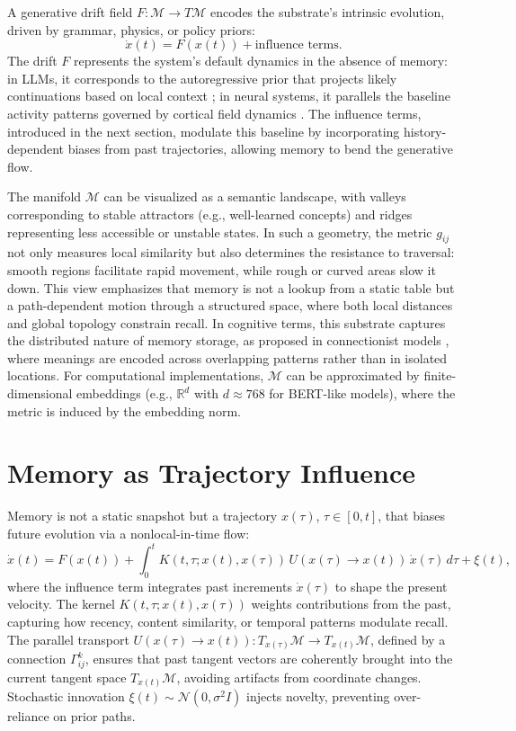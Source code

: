 \documentclass[a4paper,12pt]{article}
\newcommand{\M}{\mathcal{M}}
\begin{document}
A generative drift field $F: \M \to T\M$ encodes the substrate's intrinsic evolution, driven by grammar, physics, or policy priors:
\[
\dot{x}(t) = F(x(t)) + \text{influence terms}.
\]
The drift $F$ represents the system's default dynamics in the absence of memory: in LLMs, it corresponds to the autoregressive prior that projects likely continuations based on local context \citep{vaswani2017attention}; in neural systems, it parallels the baseline activity patterns governed by cortical field dynamics \citep{amari1977dynamics}. The influence terms, introduced in the next section, modulate this baseline by incorporating history-dependent biases from past trajectories, allowing memory to bend the generative flow.

The manifold $\M$ can be visualized as a semantic landscape, with valleys corresponding to stable attractors (e.g., well-learned concepts) and ridges representing less accessible or unstable states. In such a geometry, the metric $g_{ij}$ not only measures local similarity but also determines the resistance to traversal: smooth regions facilitate rapid movement, while rough or curved areas slow it down. This view emphasizes that memory is not a lookup from a static table but a path-dependent motion through a structured space, where both local distances and global topology constrain recall. In cognitive terms, this substrate captures the distributed nature of memory storage, as proposed in connectionist models \citep{mcclelland1995why}, where meanings are encoded across overlapping patterns rather than in isolated locations. For computational implementations, $\M$ can be approximated by finite-dimensional embeddings (e.g., $\mathbb{R}^d$ with $d \approx 768$ for BERT-like models), where the metric is induced by the embedding norm.

\section{Memory as Trajectory Influence}
Memory is not a static snapshot but a trajectory $x(\tau)$, $\tau \in [0,t]$, that biases future evolution via a nonlocal-in-time flow:
\[
\dot{x}(t) = F(x(t)) + \int_0^t K(t,\tau; x(t), x(\tau)) \, U(x(\tau) \to x(t)) \, \dot{x}(\tau) \, d\tau + \xi(t),
\]
where the influence term integrates past increments $\dot{x}(\tau)$ to shape the present velocity. The kernel $K(t,\tau; x(t), x(\tau))$ weights contributions from the past, capturing how recency, content similarity, or temporal patterns modulate recall. The parallel transport $U(x(\tau) \to x(t)): T_{x(\tau)}\M \to T_{x(t)}\M$, defined by a connection $\Gamma^k_{ij}$, ensures that past tangent vectors are coherently brought into the current tangent space $T_{x(t)}\M$, avoiding artifacts from coordinate changes. Stochastic innovation $\xi(t) \sim \mathcal{N}(0, \sigma^2 I)$ injects novelty, preventing over-reliance on prior paths.
\end{document}
